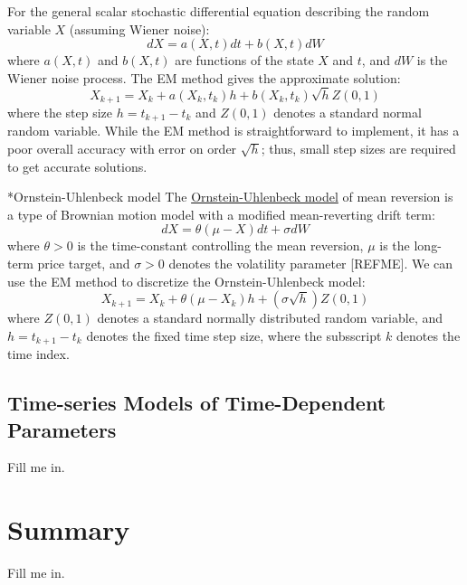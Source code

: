 \documentclass[11pt]{article}
\makeatletter
\theoremstyle{definition}
\renewcommand\subsubsection{\@startsection
	{subsubsection}{2}{0mm}
	{-0.05in}
	{-0.5\baselineskip}
	{\normalfont\normalsize\itshape\bfseries}}
\makeatother
\begin{document}
\begin{definition}\label{defn-em-method}
For the general scalar stochastic differential equation describing the random variable $X$ (assuming Wiener noise):
\begin{equation}\label{eqn-generic-scalar-sde}
dX = a(X,t)dt + b(X,t)dW
\end{equation}
where $a(X,t)$ and $b(X,t)$ are functions of the state $X$ and $t$, and $dW$ is the Wiener noise process.
The EM method gives the approximate solution:
\begin{equation*}\label{eqn-em-method}
X_{k+1} = X_{k} + a(X_{k}, t_{k})h + b(X_{k},t_{k})\sqrt{h}Z\left(0,1\right)
\end{equation*}
where the step size $h=t_{k+1} - t_{k}$ and $Z(0,1)$ denotes a standard normal random variable.  
While the EM method is straightforward to implement, it has a poor overall accuracy with error on order $\sqrt{h}$; 
thus, small step sizes are required to get accurate solutions.
\end{definition}

\subsubsection*{Ornstein-Uhlenbeck model}
The \href{https://en.wikipedia.org/wiki/Ornstein–Uhlenbeck_process}{Ornstein-Uhlenbeck model} of mean reversion is a type of Brownian motion model 
with a modified mean-reverting drift term:
\begin{equation*}\label{eqn-ou-model}
dX = \theta\left(\mu-X\right)dt + {\sigma}dW
\end{equation*}
where $\theta>0$ is the time-constant controlling the mean reversion, 
$\mu$ is the long-term price target, and $\sigma>0$ denotes the volatility parameter [REFME]. 
We can use the EM method to discretize the Ornstein-Uhlenbeck model:
\begin{equation*}\label{eqn-EM-soln-OU-model}
X_{k+1} = X_{k} + \theta\left(\mu-X_{k}\right)h + \left(\sigma\sqrt{h}\right)Z(0,1)
\end{equation*}
where $Z(0,1)$ denotes a standard normally distributed random variable, 
and $h = t_{k+1} - t_{k}$ denotes the fixed time step size, where the subsscript $k$ denotes the time index. 

\subsection*{Time-series Models of Time-Dependent Parameters}
Fill me in.

\section*{Summary}
Fill me in. 



\clearpage
\printindex
\end{document}
